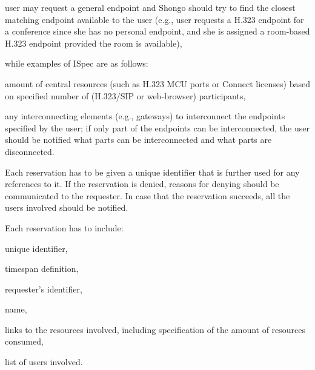 \documentclass[a4paper]{report}
\makeatletter
\newcounter{UCcounter}
\newenvironment{UseCases}%
	{\begin{list}{\textbf{UC-\arabic{UCcounter}}}{\@nmbrlisttrue\def\@listctr{UCcounter}}}%
	{\end{list}}
\makeatother
\begin{document}
\begin{UseCases}
\begin{compactitem}
\item user may request a general endpoint and Shongo should try to find the
closest matching endpoint available to the user (e.g., user requests a H.323
endpoint for a conference since she has no personal endpoint, and she is
assigned a room-based H.323 endpoint provided the room is available),

\end{compactitem}

while examples of ISpec are as follows:

\begin{compactitem}

\item amount of central resources (such as H.323 MCU ports or Connect licenses)
based on specified number of (H.323/SIP or web-browser) participants,

\item any interconnecting elements (e.g., gateways) to interconnect the
endpoints specified by the user; if only part of the endpoints can be
interconnected, the user should be notified what parts can be interconnected
and what parts are disconnected.

\end{compactitem}

Each reservation has to be given a unique identifier that is further used for
any references to it. If the reservation is denied, reasons for denying should
be communicated to the requester. In case that the reservation succeeds, all
the users involved should be notified.


Each reservation has to include:

\begin{compactitem}

\item unique identifier,

\item timespan definition,

\item requester's identifier,

\item name,

\item links to the resources involved, including specification of the amount of resources consumed,

\item list of users involved.

\end{compactitem}


\end{UseCases}
\end{document}
